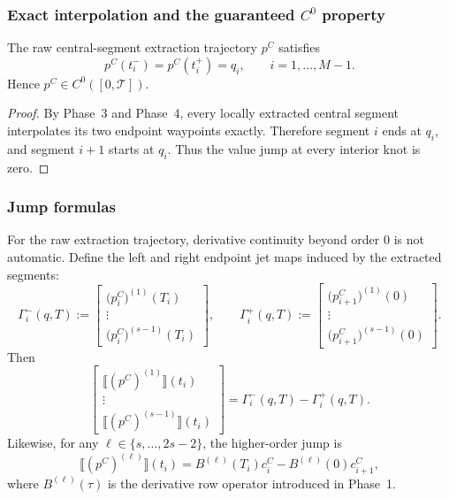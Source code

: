 \subsubsection{Exact interpolation and the guaranteed \(C^0\) property}
\label{subsubsec:phase5_schemeC_C0}

\begin{theorem}
\label{thm:phase5_schemeC_C0}
The raw central-segment extraction trajectory \(p^C\) satisfies
\[
p^C(t_i^-)=p^C(t_i^+)=q_i,
\qquad i=1,\dots,M-1.
\]
Hence \(p^C\in C^0([0,\mathcal T])\).
\end{theorem}

\begin{proof}
By Phase~3 and Phase~4, every locally extracted central segment interpolates its two endpoint waypoints exactly.
Therefore segment \(i\) ends at \(q_i\), and segment \(i+1\) starts at \(q_i\).
Thus the value jump at every interior knot is zero.
\end{proof}

\subsubsection{Jump formulas}
\label{subsubsec:phase5_schemeC_jump_formula}

For the raw extraction trajectory, derivative continuity beyond order \(0\) is not automatic.
Define the left and right endpoint jet maps induced by the extracted segments:
\begin{equation}
\label{eq:phase5_schemeC_endpoint_maps}
\Gamma_i^{-}(q,T)
:=
\begin{bmatrix}
\bigl(p_i^C\bigr)^{(1)}(T_i)\\
\vdots\\
\bigl(p_i^C\bigr)^{(s-1)}(T_i)
\end{bmatrix},
\qquad
\Gamma_i^{+}(q,T)
:=
\begin{bmatrix}
\bigl(p_{i+1}^C\bigr)^{(1)}(0)\\
\vdots\\
\bigl(p_{i+1}^C\bigr)^{(s-1)}(0)
\end{bmatrix}.
\end{equation}
Then
\begin{equation}
\label{eq:phase5_schemeC_jump_lower}
\begin{bmatrix}
\llbracket (p^C)^{(1)}\rrbracket(t_i)\\
\vdots\\
\llbracket (p^C)^{(s-1)}\rrbracket(t_i)
\end{bmatrix}
=
\Gamma_i^{-}(q,T)-\Gamma_i^{+}(q,T).
\end{equation}
Likewise, for any \(\ell\in\{s,\dots,2s-2\}\), the higher-order jump is
\begin{equation}
\label{eq:phase5_schemeC_jump_higher}
\llbracket (p^C)^{(\ell)}\rrbracket(t_i)
=
B^{(\ell)}(T_i)c_i^C - B^{(\ell)}(0)c_{i+1}^C,
\end{equation}
where \(B^{(\ell)}(\tau)\) is the derivative row operator introduced in Phase~1.

